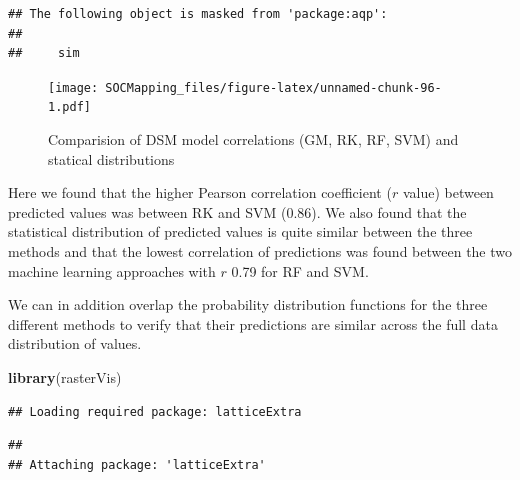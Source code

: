 \documentclass[10pt,b5paper,]{book}
\newenvironment{Shaded}{\begin{snugshade}}{\end{snugshade}}
\newcommand{\CommentTok}[1]{\textcolor[rgb]{0.56,0.35,0.01}{\textit{#1}}}
\newcommand{\DataTypeTok}[1]{\textcolor[rgb]{0.13,0.29,0.53}{#1}}
\newcommand{\KeywordTok}[1]{\textcolor[rgb]{0.13,0.29,0.53}{\textbf{#1}}}
\newcommand{\NormalTok}[1]{#1}
\newcommand{\OtherTok}[1]{\textcolor[rgb]{0.56,0.35,0.01}{#1}}
\newcommand{\StringTok}[1]{\textcolor[rgb]{0.31,0.60,0.02}{#1}}
\theoremstyle{definition}
\theoremstyle{definition}
\theoremstyle{definition}
\theoremstyle{remark}
\begin{document}
\begin{verbatim}
## The following object is masked from 'package:aqp':
## 
##     sim
\end{verbatim}

\begin{Shaded}
\end{Shaded}

\begin{figure}
\centering
\texttt{[image: SOCMapping\_files/figure-latex/unnamed-chunk-96-1.pdf]}
\caption{\label{fig:unnamed-chunk-96}Comparision of DSM model correlations
(GM, RK, RF, SVM) and statical distributions}
\end{figure}

Here we found that the higher Pearson correlation coefficient (\(r\)
value) between predicted values was between RK and SVM (0.86). We also
found that the statistical distribution of predicted values is quite
similar between the three methods and that the lowest correlation of
predictions was found between the two machine learning approaches with
\(r\) 0.79 for RF and SVM.

We can in addition overlap the probability distribution functions for
the three different methods to verify that their predictions are similar
across the full data distribution of values.

\begin{Shaded}
\begin{Highlighting}[]
\KeywordTok{library}\NormalTok{(rasterVis)}
\end{Highlighting}
\end{Shaded}

\begin{verbatim}
## Loading required package: latticeExtra
\end{verbatim}

\begin{verbatim}
## 
## Attaching package: 'latticeExtra'
\end{verbatim}
\end{document}
